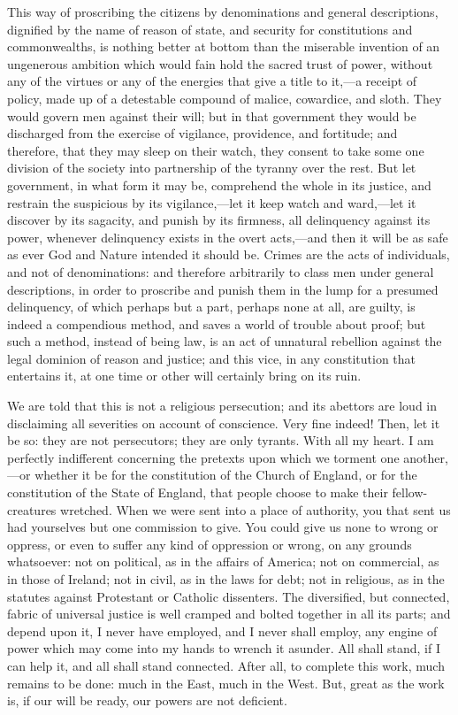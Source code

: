 This way of proscribing the citizens by denominations and general descriptions, dignified by the name of reason of state, and security for constitutions and commonwealths, is nothing better at bottom than the miserable invention of an ungenerous ambition which would fain hold the sacred trust of power, without any of the virtues or any of the energies that give a title to it,—a receipt of policy, made up of a detestable compound of malice, cowardice, and sloth. They would govern men against their will; but in that government they would be discharged from the exercise of vigilance, providence, and fortitude; and therefore, that they may sleep on their watch, they consent to take some one division of the society into partnership of the tyranny over the rest. But let government, in what form it may be, comprehend the whole in its justice, and restrain the suspicious by its vigilance,—let it keep watch and ward,—let it discover by its sagacity, and punish by its firmness, all delinquency against its power, whenever delinquency exists in the overt acts,—and then it will be as safe as ever God and Nature intended it should be. Crimes are the acts of individuals, and not of denominations: and therefore arbitrarily to class men under general descriptions, in order to proscribe and punish them in the lump for a presumed delinquency, of which perhaps but a part, perhaps none at all, are guilty, is indeed a compendious method, and saves a world of trouble about proof; but such a method, instead of being law, is an act of unnatural rebellion against the legal dominion of reason and justice; and this vice, in any constitution that entertains it, at one time or other will certainly bring on its ruin.

We are told that this is not a religious persecution; and its abettors are loud in disclaiming all severities on account of conscience. Very fine indeed! Then, let it be so: they are not persecutors; they are only tyrants. With all my heart. I am perfectly indifferent concerning the pretexts upon which we torment one another,—or whether it be for the constitution of the Church of England, or for the constitution of the State of England, that people choose to make their fellow-creatures wretched. When we were sent into a place of authority, you that sent us had yourselves but one commission to give. You could give us none to wrong or oppress, or even to suffer any kind of oppression or wrong, on any grounds whatsoever: not on political, as in the affairs of America; not on commercial, as in those of Ireland; not in civil, as in the laws for debt; not in religious, as in the statutes against Protestant or Catholic dissenters. The diversified, but connected, fabric of universal justice is well cramped and bolted together in all its parts; and depend upon it, I never have employed, and I never shall employ, any engine of power which may come into my hands to wrench it asunder. All shall stand, if I can help it, and all shall stand connected. After all, to complete this work, much remains to be done: much in the East, much in the West. But, great as the work is, if our will be ready, our powers are not deficient.

